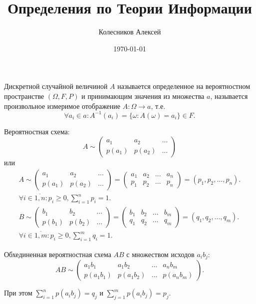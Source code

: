 \documentclass{article}
\title{Определения по Теории Информации}
\date{\today}
\author{Колесников Алексей}
\begin{document}
\maketitle

\opr Дискретной случайной величиной $A$ называется определенное на вероятностном пространстве $(\Omega, F, P)$ и принимающим
значения из множества $a$, называется произвольное измеримое отображение $A: \Omega \rightarrow a$, т.е.
$$
\forall a_i \in a : A^{-1}(a_i) = \{\omega: A(\omega) = a_i\} \in F.
$$

\opr Вероятностная схема:
$$
A \sim
\begin{pmatrix}
    a_1 & a_2 & \dots \\
    p(a_1) & p(a_2) & \dots
\end{pmatrix}
$$
или
\begin{align*}
A \sim
\begin{pmatrix}
    a_1 & a_2 & \dots \\
    p(a_1) & p(a_2) & \dots
\end{pmatrix}
=
\begin{pmatrix}
    a_1 & a_2 & \dots & a_n \\
    p_1 & p_2 & \dots & p_n
\end{pmatrix}
=
( p_1, p_2, \dots, p_n ). \\
\forall i \in \overline{1, n} : p_i \geq 0, \sum_{i=1}^{n} p_i = 1.\\
B \sim
\begin{pmatrix}
    b_1 & b_2 & \dots \\
    p(b_1) & p(b_2) & \dots
\end{pmatrix}
=
\begin{pmatrix}
    b_1 & b_2 & \dots & b_m \\
    q_1 & q_2 & \dots & q_m
\end{pmatrix}
=
( q_1, q_2, \dots, q_m ). \\
\forall i \in \overline{1, m} : p_i \geq 0, \sum_{i=1}^{m} q_i = 1.
\end{align*}

\opr Обхединенная вероятностная схема $AB$ с множеством исходов $a_ib_j$:
$$
AB \sim 
\begin{pmatrix}
    a_1b_1 & a_1b_2 & \dots & a_nb_m \\
    p(a_1b_1) & p(a_1b_2) & \dots & p(a_nb_m)
\end{pmatrix}.
$$

При этом $\sum\limits_{i=1}^{n} p(a_ib_j) = q_j$ и $\sum\limits_{j=1}^{m}p(a_ib_j) = p_j$.
\end{document}

